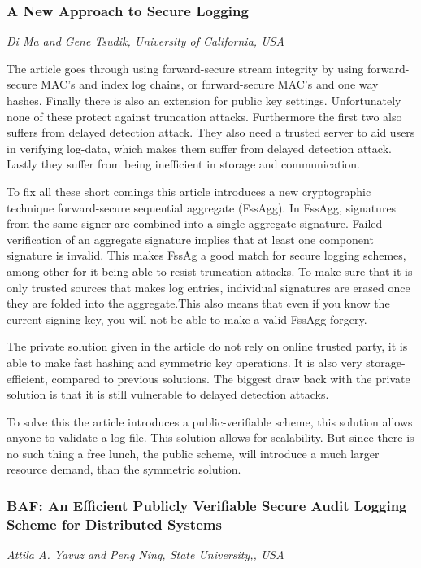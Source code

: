 \subsubsection{A New Approach to Secure Logging}
\vspace{-3mm}
{\footnotesize \it Di Ma and Gene Tsudik, University of California, USA}~\cite{ma}

The article goes through using forward-secure stream integrity by
using forward-secure MAC's and index log chains, or forward-secure
MAC's and one way hashes. Finally there is also an extension for
public key settings. Unfortunately none of these protect against
truncation attacks. Furthermore the first two also suffers from
delayed detection attack. They also need a trusted server to aid users
in verifying log-data, which makes them suffer from delayed detection
attack. Lastly they suffer from being inefficient in storage and
communication.

To fix all these short comings this article introduces a new
cryptographic technique forward-secure sequential aggregate
(FssAgg). In FssAgg, signatures from the same signer are combined into
a single aggregate signature. Failed verification of an aggregate
signature implies that at least one component signature is
invalid. This makes FssAg a good match for secure logging schemes,
among other for it being able to resist truncation attacks. To make
sure that it is only trusted sources that makes log entries,
individual signatures are erased once they are folded into the
aggregate.This also means that even if you know the current signing
key, you will not be able to make a valid FssAgg forgery.

The private solution given in the article do not rely on online
trusted party, it is able to make fast hashing and symmetric key
operations. It is also very storage-efficient, compared to previous
solutions. The biggest draw back with the private solution is that it
is still vulnerable to delayed detection attacks.

To solve this the article introduces a public-verifiable scheme, this
solution allows anyone to validate a log file. This solution allows
for scalability. But since there is no such thing a free lunch, the
public scheme, will introduce a much larger resource demand, than the
symmetric solution.~\cite{ma}


\subsubsection{BAF: An Efficient Publicly Verifiable Secure Audit Logging Scheme for Distributed Systems}
\vspace{-3mm}
{\footnotesize \it Attila A. Yavuz and Peng Ning, State University,, USA}~\cite{baf}

